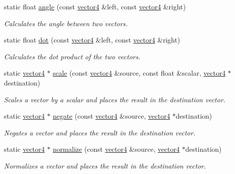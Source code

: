 \begin{DoxyCompactItemize}
static float \hyperlink{classflounder_1_1vector4_af942da47d6d34b4159da4911f36dcff2}{angle} (const \hyperlink{classflounder_1_1vector4}{vector4} \&left, const \hyperlink{classflounder_1_1vector4}{vector4} \&right)
\begin{DoxyCompactList}\small\item\em Calculates the angle between two vectors. \end{DoxyCompactList}\item 
static float \hyperlink{classflounder_1_1vector4_a6ee7f029c5143428d421d404461a4a5b}{dot} (const \hyperlink{classflounder_1_1vector4}{vector4} \&left, const \hyperlink{classflounder_1_1vector4}{vector4} \&right)
\begin{DoxyCompactList}\small\item\em Calculates the dot product of the two vectors. \end{DoxyCompactList}\item 
static \hyperlink{classflounder_1_1vector4}{vector4} $\ast$ \hyperlink{classflounder_1_1vector4_a5b5371c3619896e32b0332a336a10ee3}{scale} (const \hyperlink{classflounder_1_1vector4}{vector4} \&source, const float \&scalar, \hyperlink{classflounder_1_1vector4}{vector4} $\ast$destination)
\begin{DoxyCompactList}\small\item\em Scales a vector by a scalar and places the result in the destination vector. \end{DoxyCompactList}\item 
static \hyperlink{classflounder_1_1vector4}{vector4} $\ast$ \hyperlink{classflounder_1_1vector4_a32652955e52bc37f0aa83dbcd86ca432}{negate} (const \hyperlink{classflounder_1_1vector4}{vector4} \&source, \hyperlink{classflounder_1_1vector4}{vector4} $\ast$destination)
\begin{DoxyCompactList}\small\item\em Negates a vector and places the result in the destination vector. \end{DoxyCompactList}\item 
static \hyperlink{classflounder_1_1vector4}{vector4} $\ast$ \hyperlink{classflounder_1_1vector4_a9e6b492a08b3e69b63badb88dada1129}{normalize} (const \hyperlink{classflounder_1_1vector4}{vector4} \&source, \hyperlink{classflounder_1_1vector4}{vector4} $\ast$destination)
\begin{DoxyCompactList}\small\item\em Normalizes a vector and places the result in the destination vector. \end{DoxyCompactList}\item 

\end{DoxyCompactItemize}
